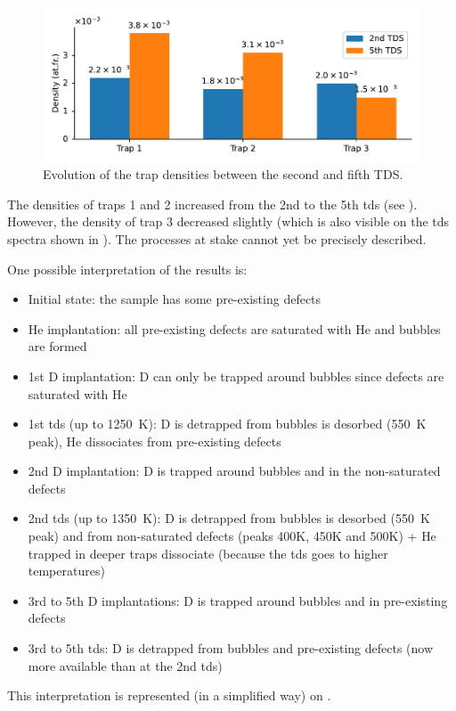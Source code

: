 \begin{figure}
    \centering
    \includegraphics[width=\linewidth]{Figures/Chapter5/trap_densities.pdf}
    \caption{Evolution of the trap densities between the second and fifth TDS.}
\end{figure}

The densities of traps 1 and 2 increased from the 2nd to the 5th \gls{tds} (see ).
However, the density of trap 3 decreased slightly (which is also visible on the \gls{tds} spectra shown in ).
The processes at stake cannot yet be precisely described. 

One possible interpretation of the results is:
\begin{itemize}
    \item Initial state: the sample has some pre-existing defects %
    \item \gls{He} implantation: all pre-existing defects are saturated with \gls{He} and bubbles are formed
    \item 1st \gls{D} implantation: \gls{D} can only be trapped around bubbles since defects are saturated with \gls{He}
    \item 1st \gls{tds} (up to \SI{1250}{K}): \gls{D} is detrapped from bubbles is desorbed (\SI{550}{K} peak), \gls{He} dissociates from pre-existing defects 
    \item 2nd \gls{D} implantation: \gls{D} is trapped around bubbles and in the non-saturated defects
    \item 2nd \gls{tds} (up to \SI{1350}{K}): \gls{D} is detrapped from bubbles is desorbed (\SI{550}{K} peak) and from non-saturated defects (peaks 400K, 450K and 500K) + \gls{He} trapped in deeper traps dissociate (because the \gls{tds} goes to higher temperatures)
    \item 3rd to 5th \gls{D} implantations: \gls{D} is trapped around bubbles and in pre-existing defects
    \item 3rd to 5th \gls{tds}: \gls{D} is detrapped from bubbles and pre-existing defects (now more available than at the 2nd \gls{tds})
\end{itemize}
This interpretation is represented (in a simplified way) on .


